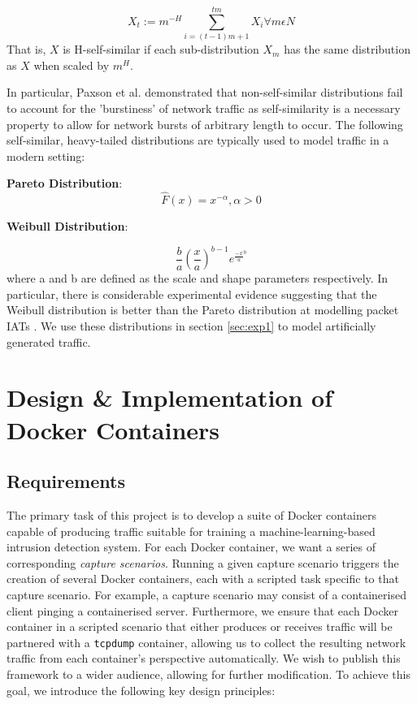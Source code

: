 \documentclass[msc,deptreport, cs]{infthesis} %
\begin{document}
$$X_t := m^{-H} \sum_{i = (t-1)m+1}^{tm} X_i \forall m \epsilon N $$
That is, $X$ is H-self-similar if each sub-distribution $X_{m}$ has the same distribution as $X$ when scaled by $m^H$.

In particular, Paxson et al. \cite{paxson1995wide} demonstrated that non-self-similar distributions fail to account for the 'burstiness' of network traffic as self-similarity is a necessary property to allow for network bursts of arbitrary length to occur.
The following self-similar, heavy-tailed distributions are typically used to model traffic in a modern setting:

\vspace{5mm}

\textbf{Pareto Distribution}: $$ \hat{F}(x) = x ^{-\alpha}, \alpha > 0$$

\textbf{Weibull Distribution}: 

$$ \frac{b}{a} (\frac{x}{a})^{b-1} e^{\frac{-x}{a}}^b $$
where a and b are defined as the scale and shape parameters respectively. In particular, there is considerable experimental evidence suggesting that the Weibull distribution is better than the Pareto distribution at modelling packet IATs \cite{arfeen2013role} \cite{arshadi2011tcp} . We use these distributions in section \ref{sec:exp1} to model artificially generated traffic.







\chapter{Design \& Implementation of Docker Containers}
\label{sec:designandimp}

\section{Requirements}
\label{sec:require}

The primary task of this project is to develop a suite of Docker containers capable of producing traffic suitable for training a machine-learning-based intrusion detection system.  For each Docker container, we want a series of corresponding \textit{capture scenarios}. Running a given capture scenario triggers the creation of several Docker containers, each with a scripted task specific to that capture scenario. For example, a capture scenario may consist of a containerised client pinging a containerised server. Furthermore, we ensure that each Docker container in a scripted scenario that either produces or receives traffic will be partnered with a \texttt{tcpdump} container, allowing us to collect the resulting network traffic from each container's perspective automatically. We wish to publish this framework to a wider audience, allowing for further modification. To achieve this goal, we introduce the following key design principles:
\end{document}
